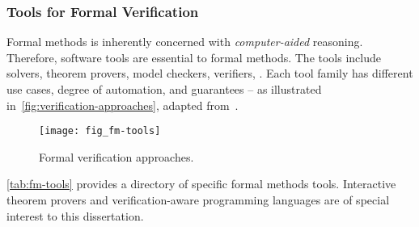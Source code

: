 \subsubsection{Tools for Formal Verification}

Formal methods is inherently concerned with \emph{computer-aided} reasoning.
Therefore, software tools are essential to formal methods. The tools include
solvers, theorem provers, model checkers, verifiers, \etc. Each tool family has
different use cases, degree of automation, and guarantees -- as illustrated
in~\autoref{fig:verification-approaches}, adapted from~\textcite{leroy2018}.

\begin{figure}[ht]
\centering
\texttt{[image: fig\_fm-tools]}
\caption[Formal verification approaches]{
Formal verification approaches.}
\label{fig:verification-approaches}
\end{figure}

\autoref{tab:fm-tools} provides a directory of specific formal methods tools.
Interactive theorem provers and verification-aware programming languages are of
special interest to this dissertation.

